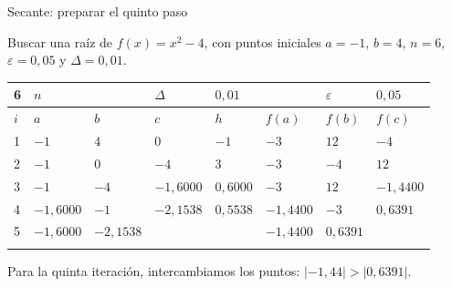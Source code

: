\documentclass[original_version/main.tex]{subfiles}
\begin{document}
\begin{frame}[t]{Secante: preparar el quinto paso}
\begin{minipage}[t][13mm][t]{\textwidth}\small Buscar una raíz de $f(x)=x^2-4$, con puntos iniciales $a=-1$, $b=4$, $n=6$, $\varepsilon=0{,}05$ y $\Delta=0{,}01$.\end{minipage}\par{\scriptsize\setlength{\tabcolsep}{2pt}\renewcommand{\arraystretch}{1}\begin{center}\begin{tabular}{|C{.04\textwidth}|C{.112\textwidth}|C{.112\textwidth}|C{.112\textwidth}|C{.112\textwidth}|C{.112\textwidth}|C{.112\textwidth}|C{.112\textwidth}|}
\hline
\rule{0pt}{4.3mm}6 & $n$ &  &  $\Delta$  & $0{,}01$ &  & $\varepsilon$ & $0{,}05$\\\hline
\rule{0pt}{4.3mm}$i$ & $a$ & $b$ & $c$ & $h$ & $f(a)$ & $f(b)$ & $f(c)$\\\hline
\rule{0pt}{4.3mm}1 & $-1$ & $4$ & $0$ & $-1$ & $-3$ & $12$ & $-4$\\\hline
\rule{0pt}{4.3mm}2 & $-1$ & $0$ & $-4$ & $3$ & $-3$ & $-4$ & $12$\\\hline
\rule{0pt}{4.3mm}3 & $-1$ & $-4$ & $-1{,}6000$ & $0{,}6000$ & $-3$ & $12$ & $-1{,}4400$\\\hline
\rule{0pt}{4.3mm}4 & $-1{,}6000$ & $-1$ & $-2{,}1538$ & $0{,}5538$ & $-1{,}4400$ & $-3$ & $0{,}6391$\\\hline
\rule{0pt}{4.3mm}5 & $-1{,}6000$ & $-2{,}1538$ &  &  & $-1{,}4400$ & $0{,}6391$ & \\\hline
\rule{0pt}{4.3mm} &  &  &  &  &  &  & \\\hline
\end{tabular}\end{center}}\begin{minipage}[t][10mm][t]{\textwidth}\footnotesize Para la quinta iteración, intercambiamos los puntos: $|-1{,}44|>|0{,}6391|$.\end{minipage}
\end{frame}
\end{document}
